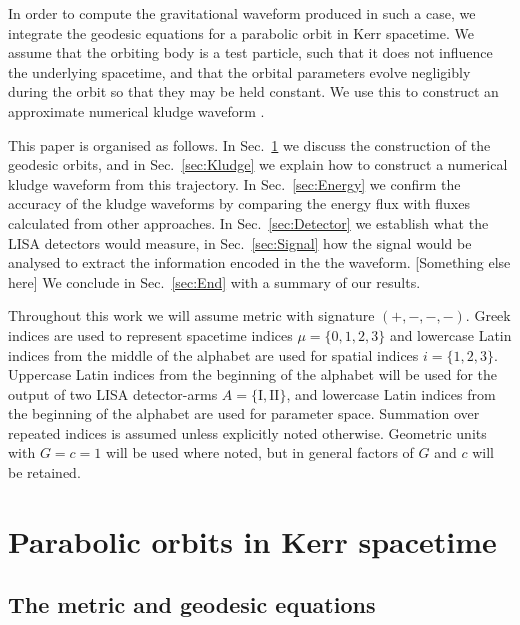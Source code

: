 \documentclass[useAMS,usedcolumn,usegraphicx,usenatbib]{mn2e}
\newcommand{\secref}[1]{Sec.~\ref{sec:#1}}
\begin{document}
In order to compute the gravitational waveform produced in such a case, we integrate the geodesic equations for a parabolic orbit in Kerr spacetime. We assume that the orbiting body is a test particle, such that it does not influence the underlying spacetime, and that the orbital parameters evolve negligibly during the orbit so that they may be held constant. We use this to construct an approximate numerical kludge waveform \citep{Babak2007}.

This paper is organised as follows. In \secref{Geodesic} we discuss the construction of the geodesic orbits, and in \secref{Kludge} we explain how to construct a numerical kludge waveform from this trajectory. In \secref{Energy} we confirm the accuracy of the kludge waveforms by comparing the energy flux with fluxes calculated from other approaches. In \secref{Detector} we establish what the LISA detectors would measure, in \secref{Signal} how the signal would be analysed to extract the information encoded in the the waveform. [Something else here]  We conclude in \secref{End} with a summary of our results.

Throughout this work we will assume metric with signature $(+,-,-,-)$. Greek indices are used to represent spacetime indices $\mu = \{0,1,2,3\}$ and lowercase Latin indices from the middle of the alphabet are used for spatial indices $i = \{1,2,3\}$. Uppercase Latin indices from the beginning of the alphabet will be used for the output of two LISA detector-arms $A = \{\mathrm{I}, \mathrm{II}\}$, and lowercase Latin indices from the beginning of the alphabet are used for parameter space. Summation over repeated indices is assumed unless explicitly noted otherwise. Geometric units with $G = c = 1$ will be used where noted, but in general factors of $G$ and $c$ will be retained.

\section{Parabolic orbits in Kerr spacetime}\label{sec:Geodesic}

\subsection{The metric and geodesic equations}
\end{document}
